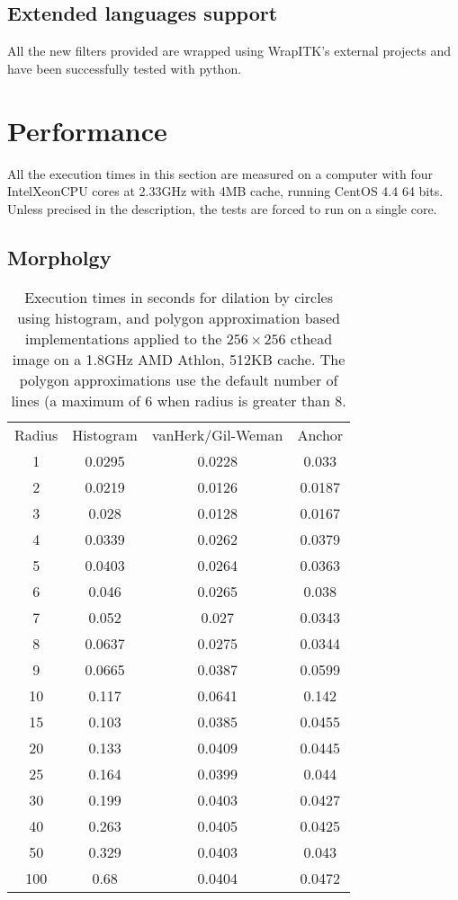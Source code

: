 \documentclass{InsightArticle}
\begin{document}
\subsection{Extended languages support}

All the new filters provided are wrapped using WrapITK's external projects
\cite{WrapITK} and have been successfully tested with python.

\section{Performance}

All the execution times in this section are measured on a computer with four
Intel\textregistered Xeon\textregistered CPU cores at 2.33GHz with 4MB cache,
running CentOS 4.4 64 bits. Unless precised in the description, the tests are
forced to run on a single core.

\subsection{Morpholgy}
\begin{table}[htbp]
\centering
\begin{tabular}{cccc}
\hline
Radius & Histogram & vanHerk/Gil-Weman & Anchor \\
1    &   0.0295  & 0.0228  & 0.033 \\
2    &   0.0219  & 0.0126  & 0.0187 \\
3    &   0.028   & 0.0128  & 0.0167 \\
4    &   0.0339  & 0.0262  & 0.0379 \\ 
5    &   0.0403  & 0.0264  & 0.0363 \\
6    &   0.046   & 0.0265  & 0.038 \\
7    &   0.052   & 0.027   & 0.0343 \\
8    &   0.0637  & 0.0275  & 0.0344 \\
9    &   0.0665  & 0.0387  & 0.0599 \\
10   &   0.117   & 0.0641  & 0.142 \\
15   &   0.103   & 0.0385  & 0.0455 \\
20   &   0.133   & 0.0409  & 0.0445 \\
25   &   0.164   & 0.0399  & 0.044 \\
30   &   0.199   & 0.0403  & 0.0427 \\
40   &   0.263   & 0.0405  & 0.0425 \\
50   &   0.329   & 0.0403  & 0.043 \\
100  &   0.68    & 0.0404  &  0.0472 \\
\hline
\hline
\end{tabular}
\caption{Execution times in seconds for dilation by circles using histogram, and polygon approximation based implementations applied to the $256 \times 256$ cthead image on a 1.8GHz AMD Athlon, 512KB cache. The polygon approximations use the default number of lines (a maximum of 6 when radius is greater than 8.\label{tab:perfPoly}}
\end{table}
\end{document}
